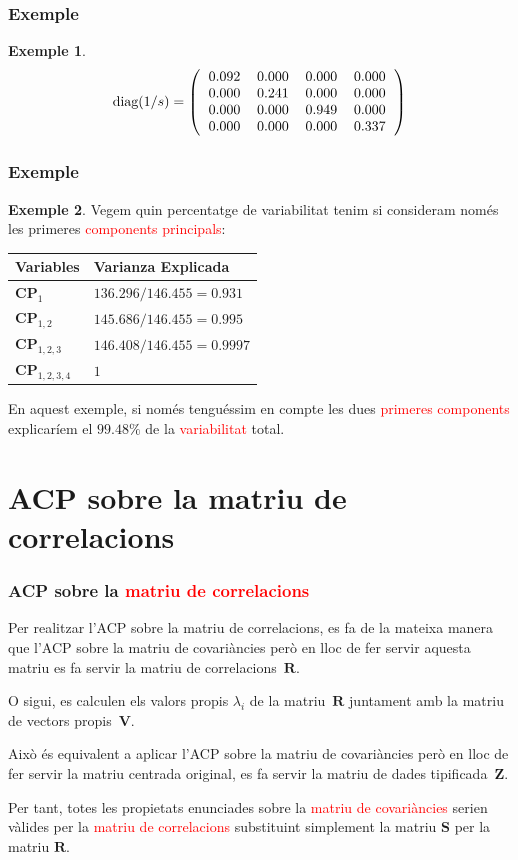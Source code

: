 \documentclass[12pt,t]{beamer}
\newcommand{\red}[1]{\textcolor{red}{#1}}
\theoremstyle{plain}
\theoremstyle{definition}
\newtheorem{exemple}{Exemple}
\begin{document}
\begin{frame}
\frametitle{Exemple}
\begin{exemple}
\[
\mbox{diag}(1/s)=\left(
\begin{tabular}{rrrr}
  0.092 & 0.000 & 0.000 & 0.000 \\ 
  0.000 & 0.241 & 0.000 & 0.000 \\ 
  0.000 & 0.000 & 0.949 & 0.000 \\ 
  0.000 & 0.000 & 0.000 & 0.337 \\ 
  \end{tabular}\right)
\]

\end{exemple}
\end{frame}

\begin{frame}
\frametitle{Exemple}
\begin{exemple}
Vegem quin percentatge de variabilitat tenim si consideram només les primeres \red{components principals}:
\begin{center}
\begin{tabular}{|l|l|}\hline
Variables&Varianza Explicada\\\hline
$\mathbf{CP}_1$&$136.296/146.455=0.931$\\\hline
$\mathbf{CP}_{1,2}$&$145.686/146.455=0.995$\\\hline
$\mathbf{CP}_{1,2,3}$&$146.408/146.455=0.9997$\\\hline
$\mathbf{CP}_{1,2,3,4}$&$1$\\\hline
\end{tabular}
\end{center}
En aquest exemple, si només tenguéssim en compte les dues \red{primeres components} explicaríem el 
$99.48\%$ de la \red{variabilitat} total.

\end{exemple}
\end{frame}

\section{ACP sobre la matriu de correlacions}
\begin{frame}
\frametitle{ACP sobre la \red{matriu de correlacions}}
Per realitzar l'ACP sobre la matriu de correlacions, es fa de la mateixa manera que l'ACP sobre la matriu de covariàncies però en lloc de fer servir aquesta matriu es fa servir la matriu de correlacions~$\mathbf{R}.$
\medskip

O sigui, es calculen els valors propis $\lambda_i$ de la matriu~$\mathbf{R}$ juntament amb la matriu de vectors propis~$\mathbf{V}$.
\medskip

Això és equivalent a aplicar l'ACP sobre la matriu de covariàncies però en lloc de fer servir la matriu centrada original, es fa servir la matriu de dades tipificada~$\mathbf{Z}.$
\medskip

Per tant, totes les propietats enunciades sobre la \red{matriu de covariàncies} serien vàlides per la \red{matriu de correlacions} substituint simplement la matriu $\mathbf{S}$ per la matriu $\mathbf{R}.$
\end{frame}
\end{document}

